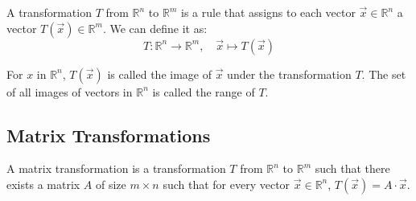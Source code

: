 \begin{definition}[Transformation]
    A transformation $T$ from $\mathbb{R}^n$ to $\mathbb{R}^m$ is a rule that assigns to each vector $\vec{x} \in \mathbb{R}^n$ a vector $T(\vec{x}) \in \mathbb{R}^m$. We can define it as:
    \[
        T: \mathbb{R}^n \to \mathbb{R}^m, \quad \vec{x} \mapsto T(\vec{x})
    \]
\end{definition}
For $x$ in $\mathbb{R}^n$, $T(\vec{x})$ is called the image of $\vec{x}$ under the transformation $T$. The set of all images of vectors in $\mathbb{R}^n$ is called the range of $T$.

\subsection{Matrix Transformations}
\begin{definition}
    A matrix transformation is a transformation $T$ from $\mathbb{R}^n$ to $\mathbb{R}^m$ such that there exists a matrix $A$ of size $m \times n$ such that for every vector $\vec{x} \in \mathbb{R}^n$, $T(\vec{x}) = A \cdot \vec{x}$.
\end{definition}

